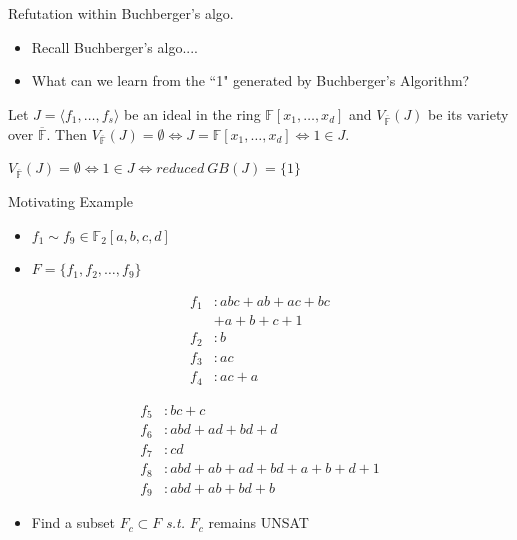 \documentclass[xcolor=dvipsnames]{beamer}
\newcommand{\bi}{\begin{itemize}}
\newcommand{\ei}{\end{itemize}}
\newcommand{\F}{{\mathbb{F}}}
\begin{document}
\begin{frame}{\large{Refutation within Buchberger's algo.}}
\bi
\item Recall Buchberger's algo....
\pause
\item  What can we learn from the \alert{``1" generated by Buchberger's Algorithm}?
\ei
\begin{Theorem}
\label{thm:weak-ns}
Let $J = \langle f_1,\dots, f_s \rangle $ be
an ideal in the ring $ \mathbb{F}[x_1, \dots, x_d]$ and $V_{\overline{\F}}(J)$ be its
variety over $\overline{\F}$. Then $V_{\overline{\F}}(J) = \emptyset \iff J =
\mathbb{F}[x_1,\dots,x_d] \iff 1 \in J$.  
\end{Theorem}
$V_{\overline{\F}}(J)=\emptyset \iff 1\in J \iff reduced~GB(J) = \{1\}$

\end{frame}
\begin{frame}{\large{Motivating Example}}
\bi
\item $f_1\sim f_9 \in \mathbb{F}_2[a,b,c,d]$
\item $F = \{f_1,f_2,\dots,f_9\}$
\ei

\begin{minipage}{2in}
\begin{align*}
f_1&: abc + ab + ac + bc \\
   & + a + b + c + 1\\
f_2&: b\\
f_3&: ac\\
f_4&: ac + a
\end{align*}
\end{minipage}
\begin{minipage}{2in}
\begin{align*}
f_5&: bc + c\\
f_6&: abd + ad + bd + d\\
f_7&: cd\\
f_8&: abd + ab + ad + bd + a + b + d + 1\\
f_9&: abd + ab +bd + b
\end{align*}
\end{minipage}
\vspace{1cm}
\bi
\item Find a subset $F_c \subset F$ {\it s.t.} $F_c$ remains UNSAT 
\ei
\end{frame}
\end{document}

